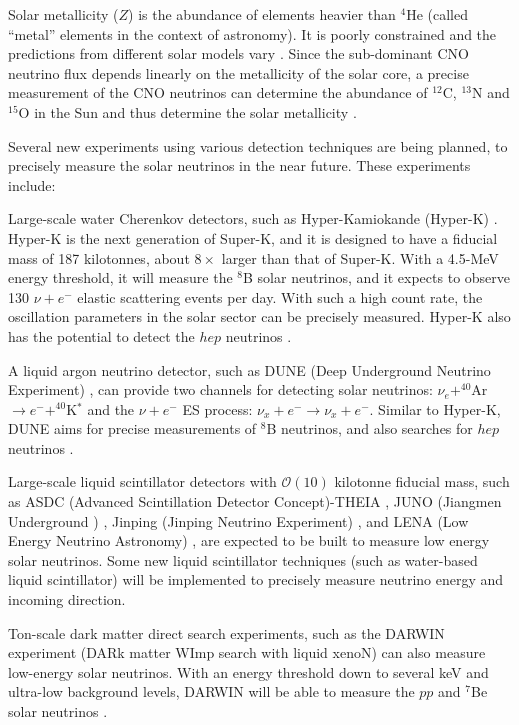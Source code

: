 Solar metallicity ($Z$) is the abundance of elements heavier than $^4$He (called ``metal'' elements in the context of astronomy). It is poorly constrained and the predictions from different solar models vary \cite{vagnozzi2017solar}. Since the sub-dominant CNO neutrino flux depends linearly on the metallicity of the solar core, a precise measurement of the CNO neutrinos can determine the abundance of $^{12}$C, $^{13}$N and $^{15}$O in the Sun and thus determine the solar metallicity \cite{cerdeno2018cno}.

Several new experiments using various detection techniques are being planned, to precisely measure the solar neutrinos in the near future. These experiments include:

Large-scale water Cherenkov detectors, such as Hyper-Kamiokande (Hyper-K) \cite{websiteHyperK}. Hyper-K is the next generation of Super-K, and it is designed to have a fiducial mass of 187 kilotonnes, about $8 \times$ larger than that of Super-K. With a 4.5-MeV energy threshold, it will measure the $^8$B solar neutrinos, and it expects to observe 130 $\nu+e^-$ elastic scattering events per day. With such a high count rate, the oscillation parameters in the solar sector can be precisely measured. Hyper-K also has the potential to detect the $hep$ neutrinos \cite{yano2019solar}. 

A liquid argon neutrino detector, such as DUNE (Deep Underground Neutrino Experiment) \cite{websiteDune}, can provide two channels for detecting solar neutrinos: $\nu_e+^{40}$Ar$\to e^-+^{40}$K$^*$ and the $\nu+e^-$ ES process: $\nu_x+e^-\to\nu_x+e^-$. Similar to Hyper-K, DUNE aims for precise measurements of $^8$B neutrinos, and also searches for $hep$ neutrinos \cite{capozzi2019dune}.

Large-scale liquid scintillator detectors with $\mathcal{O}(10)$ kilotonne fiducial mass, such as ASDC (Advanced Scintillation Detector Concept)-THEIA \cite{askins2020theia}, JUNO (Jiangmen Underground ) \cite{giaz2018status}, Jinping (Jinping Neutrino Experiment) \cite{beacom2017physics}, and LENA (Low Energy Neutrino Astronomy) \cite{wurm2013studying}, are expected to be built to measure low energy solar neutrinos. Some new liquid scintillator techniques (such as water-based liquid scintillator) will be implemented to precisely measure neutrino energy and incoming direction. %

Ton-scale dark matter direct search experiments, such as the DARWIN experiment (DARk matter WImp search with liquid xenoN) can also measure low-energy solar neutrinos. With an energy threshold down to several keV and ultra-low background levels, DARWIN will be able to measure the $pp$ and $^7$Be solar neutrinos \cite{baudis2014neutrino,aalbers2016darwin,aalbers2020solar}.

